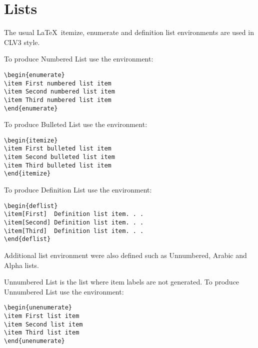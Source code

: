 \documentclass{clv3}
\begin{document}
\section{Lists}

The usual \LaTeX\ itemize, enumerate and definition list environments are used
in CLV3 style.

To produce Numbered List use the environment:

\begin{verbatim}
\begin{enumerate}
\item First numbered list item
\item Second numbered list item
\item Third numbered list item
\end{enumerate}
\end{verbatim}

To produce Bulleted List use the environment:

\begin{verbatim}
\begin{itemize}
\item First bulleted list item
\item Second bulleted list item
\item Third bulleted list item
\end{itemize}
\end{verbatim}

To produce Definition List use the environment:

\begin{verbatim}
\begin{deflist}
\item[First]  Definition list item. . .
\item[Second] Definition list item. . .
\item[Third]  Definition list item. . .
\end{deflist}
\end{verbatim}

Additional list environment were also defined such as Unnumbered, Arabic and Alpha lists.

Unnumbered List is the list where item labels are not generated. To produce Unnumbered List use the environment:

\begin{verbatim}
\begin{unenumerate}
\item First list item
\item Second list item
\item Third list item
\end{unenumerate}
\end{verbatim}
\end{document}
